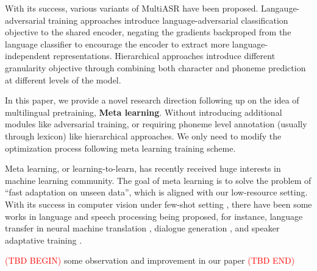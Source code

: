 With its success, various variants of MultiASR have been proposed. Langauge-adversarial training approaches \cite{Yi2018AdversarialMT, adams2019massively} introduce language-adversarial classification objective to the shared encoder, negating the gradients backproped from the language classifier to encourage the encoder to extract more language-independent representations. Hierarchical approaches \cite{Sanabria2018HierarchicalMT} introduce different granularity objective through combining both character and phoneme prediction at different levels of the model.

In this paper, we provide a novel research direction following up on the idea of multilingual pretraining, \textbf{Meta learning}. Without introducing additional modules like adversarial training, or requiring phoneme level annotation (usually through lexicon) like hierarchical approaches. We only need to modify the optimization process following meta learning training scheme.

Meta learning, or learning-to-learn, has recently received huge interests in machine learning community. The goal of meta learning is to solve the problem of ``fast adaptation on unseen data'', which is aligned with our low-resource setting. With its success in computer vision under few-shot setting \cite{rusu2018meta, snell2017prototypical, vinyals2016matching}, there have been some works in language and speech processing being proposed, for instance, language transfer in neural machine translation \cite{gu2018meta}, dialogue generation \cite{mi2019meta}, and speaker adaptative training \cite{klejch2018learning}.

\textcolor{red}{(TBD BEGIN)} some observation and improvement in our paper \textcolor{red}{(TBD END)}

\label{sec:intro}

